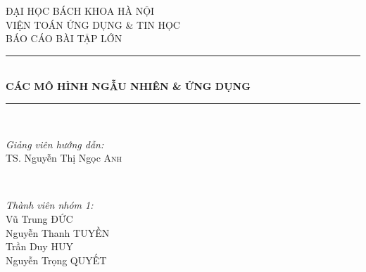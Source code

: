 \begin{titlepage}

\newcommand{\HRule}{\rule{\linewidth}{0.5mm}} %

\center %
 

\textsc{\LARGE ĐẠI HỌC BÁCH KHOA HÀ NỘI}\\[0.5cm] %
\textsc{\Large VIỆN TOÁN ỨNG DỤNG \& TIN HỌC}\\[1.5 cm] %
\textsc{\Large BÁO CÁO BÀI TẬP LỚN}\\[0.5cm] %


\HRule \\[0.4cm]
{\large \bfseries CÁC MÔ HÌNH NGẪU NHIÊN \& ỨNG DỤNG}\\[0.4cm] %
\HRule \\[1.5cm]
 

\begin{minipage}{0.4\textwidth}
\begin{flushleft} 
\emph{Giảng viên hướng dẫn:}\\
TS. Nguyễn Thị Ngọc \textsc{Anh}  %
\end{flushleft}
\end{minipage}
~
\begin{minipage}{0.4\textwidth}
\begin{flushright}
\emph{Thành viên nhóm 1:} \\
Vũ Trung ĐỨC\\ %
Nguyễn Thanh TUYỀN\\
Trần Duy HUY\\
Nguyễn Trọng QUYẾT
\end{flushright}
\end{minipage}\\[4cm]


\end{titlepage}
